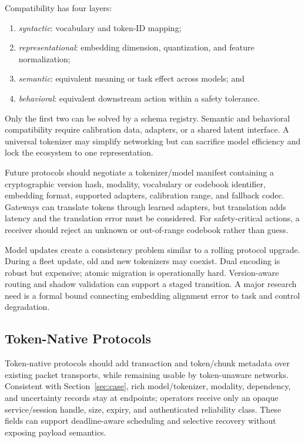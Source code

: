 \documentclass[letterpaper,journal]{IEEEtran}
\begin{document}
Compatibility has four layers:
\begin{enumerate}
\item \emph{syntactic}: vocabulary and token-ID mapping;
\item \emph{representational}: embedding dimension, quantization, and feature
normalization;
\item \emph{semantic}: equivalent meaning or task effect across models; and
\item \emph{behavioral}: equivalent downstream action within a safety
tolerance.
\end{enumerate}
Only the first two can be solved by a schema registry. Semantic and behavioral
compatibility require calibration data, adapters, or a shared latent
interface. A universal tokenizer may simplify networking but can sacrifice
model efficiency and lock the ecosystem to one representation.

Future protocols should negotiate a tokenizer/model manifest containing a
cryptographic version hash, modality, vocabulary or codebook identifier,
embedding format, supported adapters, calibration range, and fallback codec.
Gateways can translate tokens through learned adapters, but translation adds
latency and the translation error must be considered. For safety-critical actions, a receiver should
reject an unknown or out-of-range codebook rather than guess.

Model updates create a consistency problem similar to a rolling protocol
upgrade. During a fleet update, old and new tokenizers may coexist. Dual
encoding is robust but expensive; atomic migration is operationally hard.
Version-aware routing and shadow validation can support a staged transition.
A major research need is a formal bound connecting embedding alignment error
to task and control degradation.

\subsection{Token-Native Protocols}
Token-native protocols should add transaction and token/chunk metadata over
existing packet transports, while remaining usable by token-unaware networks.
Consistent with Section~\ref{sec:case}, rich model/tokenizer, modality,
dependency, and uncertainty records stay at endpoints; operators receive only
an opaque service/session handle, size, expiry, and authenticated reliability
class. These fields can support deadline-aware scheduling and selective
recovery without exposing payload semantics. 
\end{document}
